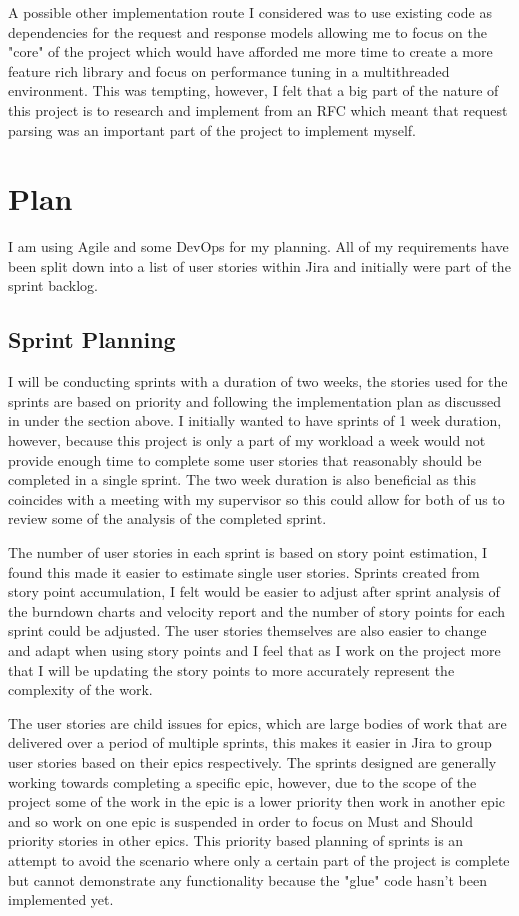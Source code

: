 \documentclass[12pt, a4paper]{article}
\begin{document}
A possible other implementation route I considered was to use existing code as dependencies for the
request and response models allowing me to focus on the "core" of the project which would have afforded
me more time to create a more feature rich library and focus on performance tuning in a multithreaded
environment. This was tempting, however, I felt that a big part of the nature of this project is to
research and implement from an RFC which meant that request parsing was an important part of the
project to implement myself.

\section{Plan} \label{sec:plan}

I am using Agile and some DevOps for my planning. All of my requirements have been split down into
a list of user stories within Jira and initially were part of the sprint backlog.

\subsection{Sprint Planning}

I will be conducting sprints with a duration of two weeks, the stories used for the sprints are
based on priority and following the implementation plan as discussed in 
under the  section above. I initially wanted to have sprints of 1 week 
duration, however, because this project is only a part of my workload a week would not provide enough
time to complete some user stories that reasonably should be completed in a single sprint. The two
week duration is also beneficial as this coincides with a meeting with my supervisor so this could
allow for both of us to review some of the analysis of the completed sprint.

The number of user stories in each sprint is based on story point estimation, I found this made it
easier to estimate single user stories. Sprints created from story point accumulation, I felt would
be easier to adjust after sprint analysis of the burndown charts and velocity report and the number
of story points for each sprint could be adjusted. The user stories themselves are also easier to
change and adapt when using story points and I feel that as I work on the project more that I will
be updating the story points to more accurately represent the complexity of the work.

The user stories are child issues for epics, which are large bodies of work that are delivered over
a period of multiple sprints, this makes it easier in Jira to group user stories based on their epics
respectively. The sprints designed are generally working towards completing a specific epic, however,
due to the scope of the project some of the work in the epic is a lower priority then work in another
epic and so work on one epic is suspended in order to focus on Must and Should priority stories in 
other epics. This priority based planning of sprints is an attempt to avoid the scenario where only
a certain part of the project is complete but cannot demonstrate any functionality because the
"glue" code hasn't been implemented yet.
\end{document}
